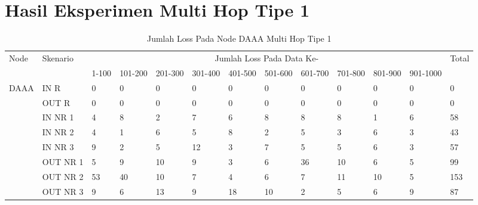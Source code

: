 \chapter{Hasil Eksperimen Multi Hop Tipe 1}
\label{lamp:C}

\begin{table}[H]
  \centering
  \caption{Jumlah Loss Pada Node DAAA Multi Hop Tipe 1}
    \begin{tabular}{|p{1cm}|p{1.9cm}|p{0.6cm}|p{0.6cm}|p{0.6cm}|p{0.6cm}|p{0.6cm}|p{0.6cm}|p{0.6cm}|p{0.6cm}|p{0.6cm}|p{0.6cm}|p{1cm}|}
    \hline
        \multirow{2}{*}{Node}&\multirow{2}{*}{Skenario}&\multicolumn{10}{|c|}{Jumlah Loss Pada Data Ke-}&\multirow{2}{*}{Total} \\\cline{3-12}
          & & 1-100 & 101-200 & 201-300 & 301-400 & 401-500 & 501-600 & 601-700 & 701-800 & 801-900 & 901-1000 & \\
        \hline
    \multirow{8}{*}{DAAA}  
    & IN R  & 0     & 0     & 0     & 0     & 0     & 0     & 0     & 0     & 0     & 0     & 0 \\
    & OUT R & 0     & 0     & 0     & 0     & 0     & 0     & 0     & 0     & 0     & 0     & 0 \\
    & IN NR 1 & 4     & 8     & 2     & 7     & 6     & 8     & 8     & 8     & 1     & 6     & 58 \\
    & IN NR 2 & 4     & 1     & 6     & 5     & 8     & 2     & 5     & 3     & 6     & 3     & 43 \\
    & IN NR 3 & 9     & 2     & 5     & 12    & 3     & 7     & 5     & 5     & 6     & 3     & 57 \\
    & OUT NR 1 & 5     & 9     & 10    & 9     & 3     & 6     & 36    & 10    & 6     & 5     & 99 \\
    & OUT NR 2 & 53    & 40    & 10    & 7     & 4     & 6     & 7     & 11    & 10    & 5     & 153 \\
    & OUT NR 3 & 9     & 6     & 13    & 9     & 18    & 10    & 2     & 5     & 6     & 9     & 87 \\
    \hline
    \end{tabular}%
  \label{tab:addlabel}%
\end{table}%

